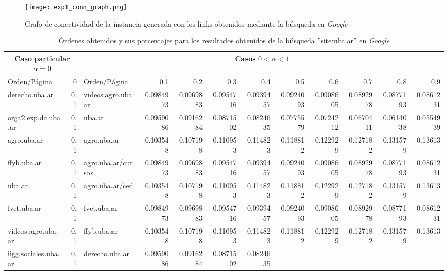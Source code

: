 \begin{figure}
    \centering
    \texttt{[image: exp1\_conn\_graph.png]}
    \caption{Grafo de conectividad de la instancia generada con los links
        obtenidos mediante la b\'usqueda en \emph{Google}}
    \label{fig:uba.ar_graph}
\end{figure}

\begin{table}
    \centering
    \caption{\'Ordenes obtenidos y sus porcentajes para los resultados obtenidos
        de la b\'usqueda ''site:uba.ar'' en \emph{Google}}
    \setlength{\tabcolsep}{3pt}
    \begin{tabular}{|l||r||l||r|r|r|r|r|r|r|r|r|}
        \hline\hline
        \multicolumn{2}{|c||}{Caso particular $\alpha = 0$}&
        \multicolumn{10}{c|}{Casos $0 < \alpha < 1$}\\
        \hline
        Orden/P\'agina & 0 & Orden/P\'agina & 0.1&0.2&0.3&0.4&0.5&0.6&0.7&0.8&0.9\\
        \hline\hline
        derecho.uba.ar& 0.1& 
        videos.agro.uba.ar& 0.0984973& 0.0969883& 0.0954716& 0.0939457&
        0.0924093& 0.0908605& 0.0892978& 0.0877193& 0.0861231\\
        orga2.exp.dc.uba.ar& 0.1&
        uba.ar& 0.0959086& 0.0916284& 0.0871502& 0.0824635& 0.0775579&
        0.0724212& 0.0670411& 0.0614038& 0.0554939\\
        agro.uba.ar& 0.1&
        agro.uba.ar& 0.103548& 0.107198 & 0.110953 & 0.114823 & 0.118812 &
        0.122929 & 0.127182 & 0.131579 & 0.13613\\
        ffyb.uba.ar& 0.1&
        agro.uba.ar/cursos& 0.0984973& 0.0969883& 0.0954716& 0.0939457
        & 0.0924093& 0.0908605& 0.0892978& 0.0877193& 0.0861231\\
        uba.ar& 0.1&
        agro.uba.ar/ced& 0.103548& 0.107198 & 0.110953 & 0.114823
        & 0.118812 & 0.122929 & 0.127182 & 0.131579 & 0.13613\\
        fvet.uba.ar& 0.1&
        fvet.uba.ar& 0.0984973& 0.0969883& 0.0954716& 0.0939457
        & 0.0924093& 0.0908605& 0.0892978& 0.0877193& 0.0861231\\
        videos.agro.uba.ar& 0.1&
        ffyb.uba.ar& 0.103548& 0.107198 & 0.110953 & 0.114823 & 0.118812
        & 0.122929 & 0.127182 & 0.131579 & 0.13613\\
        iigg.sociales.uba.ar& 0.1&
        derecho.uba.ar& 0.0959086& 0.0916284& 0.0871502& 0.0824635

\end{tabular}
\end{table}
